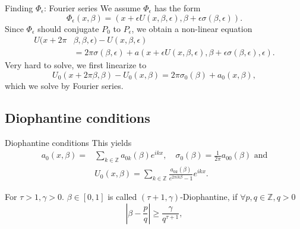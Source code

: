 \documentclass[]{beamer}
\newcommand{\e}{\epsilon}
\newcommand{\be}{\beta}
\newcommand{\g}{\gamma}
\begin{document}
\begin{frame}{Finding $\Phi_\e$: Fourier series}
    We assume $\Phi_\e$ has the form
    \begin{equation*}
        \Phi_\e (x,\be) = (x + \e U(x,\be,\e), \be + \e \sigma(\be, \e)).
    \end{equation*} \pause
    Since $\Phi_\e$ should conjugate $P_0$ to $P_\e$, we obtain
    a non-linear equation
    \begin{align*}
	    U(x + 2 \pi & \be,\be,\e) - U(x, \be, \e) \\
            & = 2 \pi \sigma(\be, \e) + a(x + \e U(x, \be, \e), \be + \e \sigma(\be, \e), \e).
    \end{align*}
    \pause
    Very hard to solve, we first linearize to
    \begin{equation}\label{eq:firstord}
        U_0(x + 2 \pi \be,\be) - U_0(x, \be)
        = 2 \pi \sigma_0(\be) + a_0(x, \be),
    \end{equation}
    which we solve by Fourier series.
\end{frame}

\subsection{Diophantine conditions}

\begin{frame}{Diophantine conditions}
    This yields
    \begin{equation}\label{eq:formalsol}
        \begin{split}
            a_0(x, \be) = & \sum_{k \in \mathbb{Z}} a_{0 k}(\be)e^{ikx},
            \quad \sigma_0(\be) = \frac{1}{2 \pi} a_{00}(\be) \text{ and} \\
            & U_0(x, \be) = \sum_{k \in \mathbb{Z}} \frac{a_{0 k}(\be)}{e^{2 \pi ik\be} - 1} e^{ikx}.
        \end{split}
    \end{equation}
    \pause
    \begin{definition}
        For $\tau > 1, \g > 0$. $\be \in [0, 1]$ is called $(\tau + 1, \g)$-Diophantine, if
        $\forall p,q \in \mathbb{Z}, q > 0$
        \begin{equation*}
            \left| \be - \frac{p}{q} \right| \ge \frac{\g}{q^{\tau + 1}},
        \end{equation*}
    \end{definition}
\end{frame}
\end{document}
